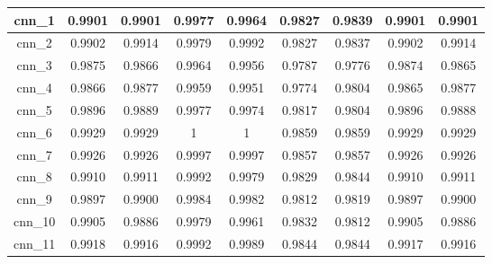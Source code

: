 \begin{table}[p]
\begin{tabular} {|c|c|c|c|c|c|c|c|c| }
        cnn\_1   & 0.9901                        & 0.9901                         & 0.9977                      & 0.9964                  & 0.9827 & 0.9839 & 0.9901 & 0.9901 \\ \hline
        cnn\_2   & 0.9902                        & 0.9914                         & 0.9979                      & 0.9992                  & 0.9827 & 0.9837 & 0.9902 & 0.9914 \\ \hline
        cnn\_3   & 0.9875                        & 0.9866                         & 0.9964                      & 0.9956                  & 0.9787 & 0.9776 & 0.9874 & 0.9865 \\ \hline
        cnn\_4   & 0.9866                        & 0.9877                         & 0.9959                      & 0.9951                  & 0.9774 & 0.9804 & 0.9865 & 0.9877 \\ \hline
        cnn\_5   & 0.9896                        & 0.9889                         & 0.9977                      & 0.9974                  & 0.9817 & 0.9804 & 0.9896 & 0.9888 \\ \hline
        cnn\_6   & 0.9929                        & 0.9929                         & 1                           & 1                       & 0.9859 & 0.9859 & 0.9929 & 0.9929 \\ \hline
        cnn\_7   & 0.9926                        & 0.9926                         & 0.9997                      & 0.9997                  & 0.9857 & 0.9857 & 0.9926 & 0.9926 \\ \hline
        cnn\_8   & 0.9910                        & 0.9911                         & 0.9992                      & 0.9979                  & 0.9829 & 0.9844 & 0.9910 & 0.9911 \\ \hline
        cnn\_9   & 0.9897                        & 0.9900                         & 0.9984                      & 0.9982                  & 0.9812 & 0.9819 & 0.9897 & 0.9900 \\ \hline
        cnn\_10  & 0.9905                        & 0.9886                         & 0.9979                      & 0.9961                  & 0.9832 & 0.9812 & 0.9905 & 0.9886 \\ \hline
        cnn\_11  & 0.9918                        & 0.9916                         & 0.9992                      & 0.9989                  & 0.9844 & 0.9844 & 0.9917 & 0.9916 \\ \hline
    \end{tabular}
\end{table}


